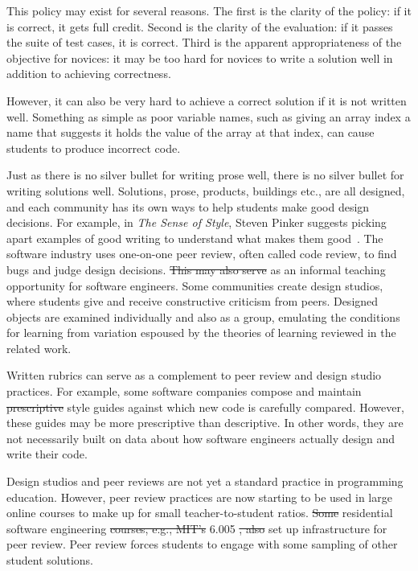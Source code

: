 \documentclass[12pt,twoside]{mitthesis}
\providecommand{\DIFaddtex}[1]{{\protect\color{blue}\uwave{#1}}} %
\providecommand{\DIFdeltex}[1]{{\protect\color{red}\sout{#1}}}                      %
\providecommand{\DIFaddbegin}{} %
\providecommand{\DIFaddend}{} %
\providecommand{\DIFdelbegin}{} %
\providecommand{\DIFdelend}{} %
\providecommand{\DIFadd}[1]{\texorpdfstring{\DIFaddtex{#1}}{#1}} %
\providecommand{\DIFdel}[1]{\texorpdfstring{\DIFdeltex{#1}}{}} %
\begin{document}
This policy may exist for several reasons. The first is the clarity of the policy: if it is correct, it gets full credit. Second is the clarity of the evaluation: if it passes the suite of test cases, it is correct. Third is the apparent appropriateness of the objective for novices: it may be too hard for novices to write a solution well in addition to achieving correctness. %

However, it can also be very hard to achieve a correct solution if it is not written well. Something as simple as poor variable names, such as giving an array index a name that suggests it holds the value of the array at that index, can cause students to produce incorrect code.

Just as there is no silver bullet for writing prose well, there is no silver bullet for writing solutions well. Solutions, prose, products, buildings etc., are all designed, and each community has its own ways to help students make good design decisions. For example, in {\it The Sense of Style}, Steven Pinker suggests picking apart examples of good writing to understand what makes them good~\cite{pinkersense}. The software industry uses one-on-one peer review, often called code review, to find bugs and judge design decisions. \DIFdelbegin \DIFdel{This may also serve }\DIFdelend \DIFaddbegin \DIFadd{It serves }\DIFaddend as an informal teaching opportunity for software engineers. Some communities create design studios, where students give and receive constructive criticism from peers. Designed objects are examined individually and also as a group, emulating the conditions for learning from variation espoused by the theories of learning reviewed in the related work. 

Written rubrics can serve as a complement to peer review and design studio practices. For example, some software companies compose and maintain \DIFdelbegin \DIFdel{prescriptive }\DIFdelend style guides against which new code is carefully compared. However, these guides may be more prescriptive than descriptive. In other words, they are not necessarily built on data about how software engineers actually design and write their code. %

Design studios and peer reviews are not yet a standard practice in programming education. However, peer review practices are now starting to be used in large online courses to make up for small teacher-to-student ratios. \DIFdelbegin \DIFdel{Some }\DIFdelend \DIFaddbegin \DIFadd{At least one }\DIFaddend residential software engineering \DIFdelbegin \DIFdel{courses, e.g., MIT's }\DIFdelend \DIFaddbegin \DIFadd{course, }\DIFaddend 6.005 \DIFdelbegin \DIFdel{, also }\DIFdelend \DIFaddbegin \DIFadd{at MIT, has }\DIFaddend set up infrastructure for peer review. Peer review forces students to engage with some sampling of other student solutions. 
\end{document}
